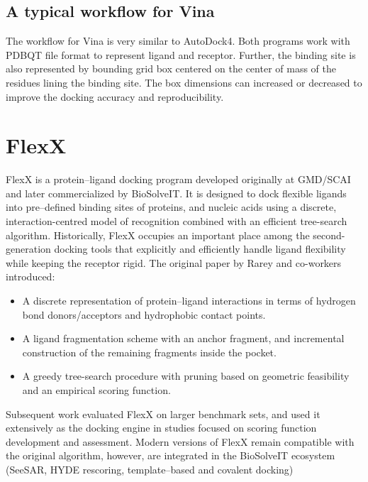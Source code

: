 \documentclass[12pt, a4paper]{article}
\begin{document}
\subsection{A typical workflow for Vina}

The workflow for Vina is very similar to AutoDock4. Both programs work with PDBQT file format to represent ligand and receptor. Further, the binding site is also represented by bounding grid box centered on the center of mass of the residues lining the binding site. The box dimensions can increased or decreased to improve the docking accuracy and reproducibility. 


\section{FlexX}
FlexX is a protein--ligand docking program developed originally at GMD/SCAI and later commercialized by BioSolveIT.\cite{CH7_rarey1996,CH7_kramer1999} It is designed to dock flexible ligands into pre--defined binding sites of proteins, and nucleic acids using a discrete, interaction-centred model of recognition combined with an efficient tree-search algorithm. Historically, FlexX occupies an important place among the second-generation docking tools that explicitly and efficiently handle ligand flexibility while keeping the receptor rigid.
The original paper by Rarey and co-workers\cite{CH7_rarey1996} introduced:

\begin{itemize}
  \item A discrete representation of protein--ligand interactions in terms of hydrogen bond donors/acceptors and hydrophobic contact points.
  \item A ligand fragmentation scheme with an anchor fragment, and incremental construction of the remaining fragments inside the pocket.
  \item A greedy tree-search procedure with pruning based on geometric feasibility and an empirical scoring function.
\end{itemize}

Subsequent work evaluated FlexX on larger benchmark sets\cite{CH7_kramer1999}, and used it extensively as the docking engine in studies focused on scoring function development and assessment.\cite{CH7_stahl,CH7_bissantz2000} Modern versions of FlexX remain compatible with the original algorithm, however, are integrated in the BioSolveIT ecosystem (SeeSAR, HYDE rescoring, template--based and covalent docking)
\end{document}
